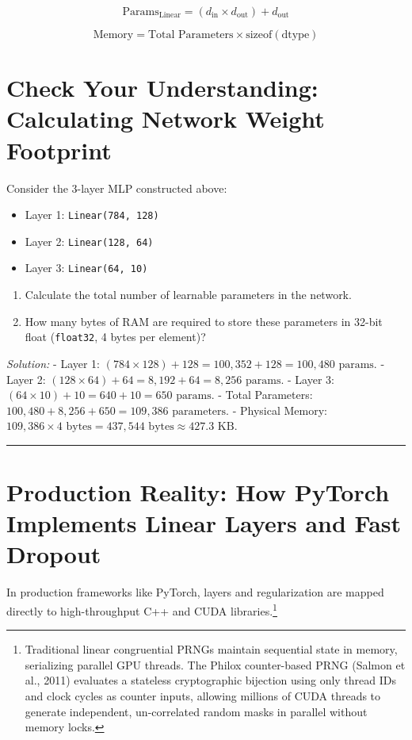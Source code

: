 \documentclass[
  letterpaper,
]{scrbook}
\providecommand{\tightlist}{%
  \setlength{\itemsep}{0pt}\setlength{\parskip}{0pt}}
\begin{document}
\[\text{Params}_{\text{Linear}} = (d_{\text{in}} \times d_{\text{out}}) + d_{\text{out}}\]

\[\text{Memory} = \text{Total Parameters} \times \text{sizeof}(\text{dtype})\]

\section{Check Your Understanding: Calculating Network Weight
Footprint}\label{check-your-understanding-calculating-network-weight-footprint}

Consider the 3-layer MLP constructed above:

\begin{itemize}
\tightlist
\item
  Layer 1: \texttt{Linear(784,\ 128)}
\item
  Layer 2: \texttt{Linear(128,\ 64)}
\item
  Layer 3: \texttt{Linear(64,\ 10)}
\end{itemize}

\begin{enumerate}
\def\labelenumi{\arabic{enumi}.}
\tightlist
\item
  Calculate the total number of learnable parameters in the network.
\item
  How many bytes of RAM are required to store these parameters in 32-bit
  float (\texttt{float32}, 4 bytes per element)?
\end{enumerate}

\emph{Solution:} - Layer 1:
\((784 \times 128) + 128 = 100,352 + 128 = 100,480\text{ params}\). -
Layer 2: \((128 \times 64) + 64 = 8,192 + 64 = 8,256\text{ params}\). -
Layer 3: \((64 \times 10) + 10 = 640 + 10 = 650\text{ params}\). - Total
Parameters: \(100,480 + 8,256 + 650 = 109,386\text{ parameters}\). -
Physical Memory:
\(109,386 \times 4\text{ bytes} = 437,544\text{ bytes} \approx 427.3\text{ KB}\).

\begin{center}\rule{0.5\linewidth}{0.5pt}\end{center}

\section{Production Reality: How PyTorch Implements Linear Layers and
Fast
Dropout}\label{production-reality-how-pytorch-implements-linear-layers-and-fast-dropout}

In production frameworks like PyTorch, layers and regularization are
mapped directly to high-throughput C++ and CUDA libraries.\footnote{Traditional
  linear congruential PRNGs maintain sequential state in memory,
  serializing parallel GPU threads. The Philox counter-based PRNG
  (Salmon et al., 2011) evaluates a stateless cryptographic bijection
  using only thread IDs and clock cycles as counter inputs, allowing
  millions of CUDA threads to generate independent, un-correlated random
  masks in parallel without memory locks.}
\end{document}
